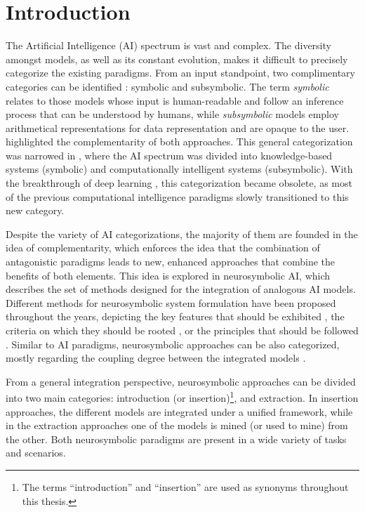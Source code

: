 \chapter{Introduction}
\label{chap:intro}
The Artificial Intelligence (AI) spectrum is vast and complex. The diversity amongst models, as well as its constant evolution, makes it difficult to precisely categorize the existing paradigms. From an input standpoint, two complimentary categories can be identified \citep{lieberman_symbolic_nodate}: symbolic and subsymbolic. The term \textit{symbolic} relates to those models whose input is human-readable and follow an inference process that can be understood by humans, while \textit{subsymbolic} models employ arithmetical representations for data representation and are opaque to the user. \cite{lieberman_symbolic_nodate} highlighted the complementarity of both approaches. This general categorization was narrowed in \cite{hopgood_2009_knowledge-based}, where the AI spectrum was divided into knowledge-based systems (symbolic) and computationally intelligent systems (subsymbolic). With the breakthrough of deep learning \citep{raina_2009_gpu,glorot_2014_relu}, this categorization became obsolete, as most of the previous computational intelligence paradigms slowly transitioned to this new category.

Despite the variety of AI categorizations, the majority of them are founded in the idea of complementarity, which enforces the idea that the combination of antagonistic paradigms leads to new, enhanced approaches that combine the benefits of both elements. This idea is explored in neurosymbolic AI, which describes the set of methods designed for the integration of analogous AI models. Different methods for neurosymbolic system formulation have been proposed throughout the years, depicting the key features that should be exhibited \citep{mcgarry_hybrid_1999}, the criteria on which they should be rooted \citep{mira_neurosymbolic_2004}, or the principles that should be followed \citep{besold_neural-symbolic_2017}. Similar to AI paradigms, neurosymbolic approaches can be also categorized, mostly regarding the coupling degree between the integrated models \citep{medsker2020models,hilario_overview_nodate}.

From a general integration perspective, neurosymbolic approaches can be divided into two main categories: introduction (or insertion)\footnote{The terms ``introduction'' and ``insertion'' are used as synonyms throughout this thesis.}, and extraction. In insertion approaches, the different models are integrated under a unified framework, while in the extraction approaches one of the models is mined (or used to mine) from the other. Both neurosymbolic paradigms are present in a wide variety of tasks and scenarios. 

